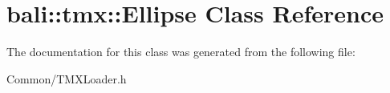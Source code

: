 \hypertarget{classbali_1_1tmx_1_1_ellipse}{\section{bali\-:\-:tmx\-:\-:Ellipse Class Reference}
\label{classbali_1_1tmx_1_1_ellipse}
}


The documentation for this class was generated from the following file\-:\begin{DoxyCompactItemize}
\item 
Common/T\-M\-X\-Loader.\-h\end{DoxyCompactItemize}
